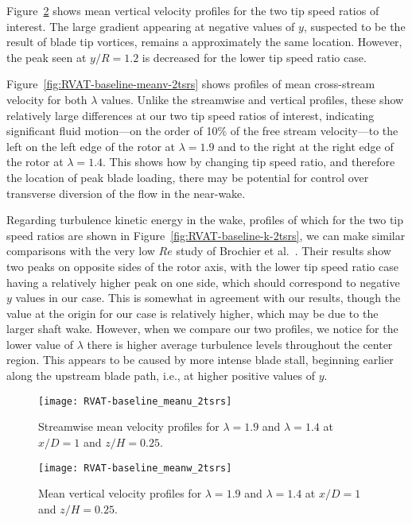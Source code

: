 Figure~\ref{fig:RVAT-baseline-meanw-2tsrs} shows mean vertical velocity profiles
for the two tip speed ratios of interest. The large gradient appearing at
negative values of $y$, suspected to be the result of blade tip vortices,
remains a approximately the same location. However, the peak seen at $y/R = 1.2$
is decreased for the lower tip speed ratio case.

Figure~\ref{fig:RVAT-baseline-meanv-2tsrs} shows profiles of mean cross-stream
velocity for both $\lambda$ values. Unlike the streamwise and vertical profiles,
these show relatively large differences at our two tip speed ratios of interest,
indicating significant fluid motion---on the order of 10\% of the free stream
velocity---to the left on the left edge of the rotor at $\lambda=1.9$ and to the
right at the right edge of the rotor at $\lambda = 1.4$. This shows how by
changing tip speed ratio, and therefore the location of peak blade loading,
there may be potential for control over transverse diversion of the flow in the
near-wake.

Regarding turbulence kinetic energy in the wake, profiles of which for the two
tip speed ratios are shown in Figure~\ref{fig:RVAT-baseline-k-2tsrs}, we can
make similar comparisons with the very low $Re$ study of Brochier et
al.~\cite{Brochier1986}. Their results show two peaks on opposite sides of the
rotor axis, with the lower tip speed ratio case having a relatively higher peak
on one side, which should correspond to negative $y$ values in our case. This is
somewhat in agreement with our results, though the value at the origin for our
case is relatively higher, which may be due to the larger shaft wake. However,
when we compare our two profiles, we notice for the lower value of $\lambda$
there is higher average turbulence levels throughout the center region. This
appears to be caused by more intense blade stall, beginning earlier along the
upstream blade path, i.e., at higher positive values of $y$.

\begin{figure}
    \centering

    \texttt{[image: RVAT-baseline\_meanu\_2tsrs]}

    \caption{Streamwise mean velocity profiles for $\lambda = 1.9$ and
        $\lambda=1.4$ at $x/D=1$ and $z/H = 0.25$.}

    \label{fig:RVAT-baseline-meanu-2tsrs}
\end{figure}

\begin{figure}
    \centering

    \texttt{[image: RVAT-baseline\_meanw\_2tsrs]}

    \caption{Mean vertical velocity profiles for $\lambda = 1.9$ and
        $\lambda=1.4$ at $x/D=1$ and $z/H = 0.25$.}

    \label{fig:RVAT-baseline-meanw-2tsrs}
\end{figure}

